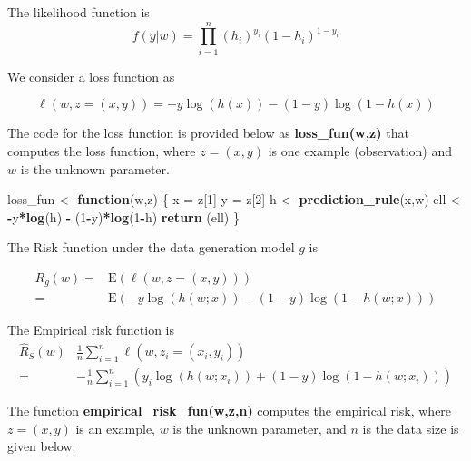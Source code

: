 \documentclass[
]{article}
\newenvironment{Shaded}{\begin{snugshade}}{\end{snugshade}}
\newcommand{\ControlFlowTok}[1]{\textcolor[rgb]{0.13,0.29,0.53}{\textbf{#1}}}
\newcommand{\DecValTok}[1]{\textcolor[rgb]{0.00,0.00,0.81}{#1}}
\newcommand{\KeywordTok}[1]{\textcolor[rgb]{0.13,0.29,0.53}{\textbf{#1}}}
\newcommand{\NormalTok}[1]{#1}
\newcommand{\OperatorTok}[1]{\textcolor[rgb]{0.81,0.36,0.00}{\textbf{#1}}}
\newcommand{\StringTok}[1]{\textcolor[rgb]{0.31,0.60,0.02}{#1}}
\begin{document}
The likelihood function is \[
f\left(y|w\right)=\prod_{i=1}^{n}\left(h_{i}\right)^{y_{i}}\left(1-h_{i}\right)^{1-y_{i}}
\]

We consider a loss function as

\[
\ell\left(w,z=\left(x,y\right)\right)=-y\log\left(h(x)\right)-\left(1-y\right)\log\left(1-h(x)\right)
\]

The code for the loss function is provided below as
\textbf{loss\_fun(w,z)} that computes the loss function, where
\(z=(x,y)\) is one example (observation) and \(w\) is the unknown
parameter.

\begin{Shaded}
\begin{Highlighting}[]
\NormalTok{loss\_fun \textless{}{-}}\StringTok{ }\ControlFlowTok{function}\NormalTok{(w,z) \{}
\NormalTok{  x =}\StringTok{ }\NormalTok{z[}\DecValTok{1}\NormalTok{]}
\NormalTok{  y =}\StringTok{ }\NormalTok{z[}\DecValTok{2}\NormalTok{]}
\NormalTok{  h \textless{}{-}}\StringTok{ }\KeywordTok{prediction\_rule}\NormalTok{(x,w)}
\NormalTok{  ell \textless{}{-}}\StringTok{ }\OperatorTok{{-}}\NormalTok{y}\OperatorTok{*}\KeywordTok{log}\NormalTok{(h) }\OperatorTok{{-}}\StringTok{ }\NormalTok{(}\DecValTok{1}\OperatorTok{{-}}\NormalTok{y)}\OperatorTok{*}\KeywordTok{log}\NormalTok{(}\DecValTok{1}\OperatorTok{{-}}\NormalTok{h)}
  \KeywordTok{return}\NormalTok{ (ell)}
\NormalTok{\}}
\end{Highlighting}
\end{Shaded}

The Risk function under the data generation model \(g\) is

\[
\begin{align*}
R_{g}\left(w\right)= & \text{E}\left(\ell\left(w,z=\left(x,y\right)\right)\right)\\
= & \text{E}\left(-y\log\left(h\left(w;x\right)\right)-\left(1-y\right)\log\left(1-h\left(w;x\right)\right)\right)
\end{align*}
\]

The Empirical risk function is \[
\begin{align*}
\hat{R}_{S}\left(w\right) & \frac{1}{n}\sum_{i=1}^{n}\ell\left(w,z_{i}=\left(x_{i},y_{i}\right)\right)\\
= & -\frac{1}{n}\sum_{i=1}^{n}\left(y_{i}\log\left(h(w;x_{i})\right)+\left(1-y\right)\log\left(1-h(w;x_{i})\right)\right)
\end{align*}
\]

The function \textbf{empirical\_risk\_fun(w,z,n)} computes the empirical
risk, where \(z=(x,y)\) is an example, \(w\) is the unknown parameter,
and \(n\) is the data size is given below.
\end{document}
